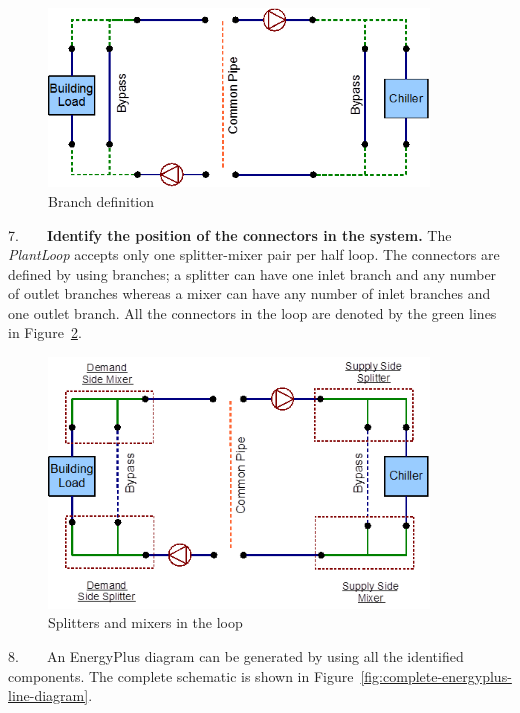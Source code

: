 \begin{figure}[hbtp] %
\centering
\includegraphics[width=0.9\textwidth, height=0.9\textheight, keepaspectratio=true]{media/image008.png}
\caption{Branch definition \protect \label{fig:branch-definition}}
\end{figure}

7.~~~~\textbf{Identify the position of the connectors in the system.} The \emph{PlantLoop} accepts only one splitter-mixer pair per half loop. The connectors are defined by using branches; a splitter can have one inlet branch and any number of outlet branches whereas a mixer can have any number of inlet branches and one outlet branch. All the connectors in the loop are denoted by the green lines in Figure~\ref{fig:splitters-and-mixers-in-the-loop}.

\begin{figure}[hbtp] %
\centering
\includegraphics[width=0.9\textwidth, height=0.9\textheight, keepaspectratio=true]{media/image009.png}
\caption{Splitters and mixers in the loop \protect \label{fig:splitters-and-mixers-in-the-loop}}
\end{figure}

8.~~~~An EnergyPlus diagram can be generated by using all the identified components. The complete schematic is shown in Figure~\ref{fig:complete-energyplus-line-diagram}.

